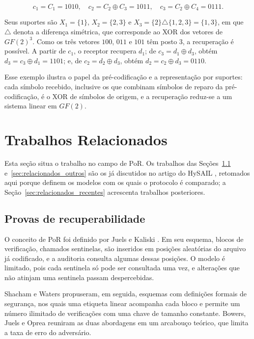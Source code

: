 \begin{equation}
c_1 = C_1 = 1010, \quad
c_2 = C_2 \oplus C_3 = 1011, \quad
c_3 = C_2 \oplus C_4 = 0111.
\end{equation}

Seus suportes são $X_1 = \{1\}$, $X_2 = \{2, 3\}$ e $X_3 = \{2\} \triangle \{1, 2, 3\} = \{1, 3\}$, em que $\triangle$ denota a diferença simétrica, que corresponde ao XOR dos vetores de $GF(2)^3$. Como os três vetores $100$, $011$ e $101$ têm posto 3, a recuperação é possível. A partir de $c_1$, o receptor recupera $d_1$; de $c_3 = d_1 \oplus d_3$, obtém $d_3 = c_3 \oplus d_1 = 1101$; e, de $c_2 = d_2 \oplus d_3$, obtém $d_2 = c_2 \oplus d_3 = 0110$.

Esse exemplo ilustra o papel da pré-codificação e a representação por suportes: cada símbolo recebido, inclusive os que combinam símbolos de reparo da pré-codificação, é o XOR de símbolos de origem, e a recuperação reduz-se a um sistema linear em $GF(2)$.

\section{Trabalhos Relacionados}

Esta seção situa o trabalho no campo de \acrshort{PoR}. Os trabalhos das Seções~\ref{sec:relacionados_por} e~\ref{sec:relacionados_outros} são os já discutidos no artigo do HySAIL \cite{amaral2019hysail}, retomados aqui porque definem os modelos com os quais o protocolo é comparado; a Seção~\ref{sec:relacionados_recentes} acrescenta trabalhos posteriores.

\subsection{Provas de recuperabilidade}
\label{sec:relacionados_por}

O conceito de \acrshort{PoR} foi definido por Juels e Kaliski \cite{juels2007pors}. Em seu esquema, blocos de verificação, chamados sentinelas, são inseridos em posições aleatórias do arquivo já codificado, e a auditoria consulta algumas dessas posições. O modelo é limitado, pois cada sentinela só pode ser consultada uma vez, e alterações que não atinjam uma sentinela passam despercebidas.

Shacham e Waters \cite{shacham2008compact} propuseram, em seguida, esquemas com definições formais de segurança, nos quais uma etiqueta linear acompanha cada bloco e permite um número ilimitado de verificações com uma chave de tamanho constante. Bowers, Juels e Oprea \cite{bowers2009proofs} reuniram as duas abordagens em um arcabouço teórico, que limita a taxa de erro do adversário.

